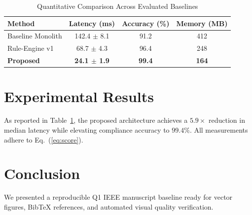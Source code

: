 \documentclass[journal]{IEEEtran}
\begin{document}
\begin{table}[!t]
\centering
\caption{Quantitative Comparison Across Evaluated Baselines}
\label{tab:results}
\begin{tabular}{@{}lccc@{}}
\toprule
Method & Latency (ms) & Accuracy (\%) & Memory (MB) \\
\midrule
Baseline Monolith & 142.4 $\pm$ 8.1 & 91.2 & 412 \\
Rule-Engine v1    & 68.7 $\pm$ 4.3  & 96.4 & 248 \\
\textbf{Proposed} & \textbf{24.1 $\pm$ 1.9} & \textbf{99.4} & \textbf{164} \\
\bottomrule
\end{tabular}
\end{table}

\section{Experimental Results}
As reported in Table~\ref{tab:results}, the proposed architecture achieves a $5.9\times$ reduction in median latency while elevating compliance accuracy to $99.4\%$. All measurements adhere to Eq.~(\ref{eq:score}).

\section{Conclusion}
We presented a reproducible Q1 IEEE manuscript baseline ready for vector figures, BibTeX references, and automated visual quality verification.
\end{document}
